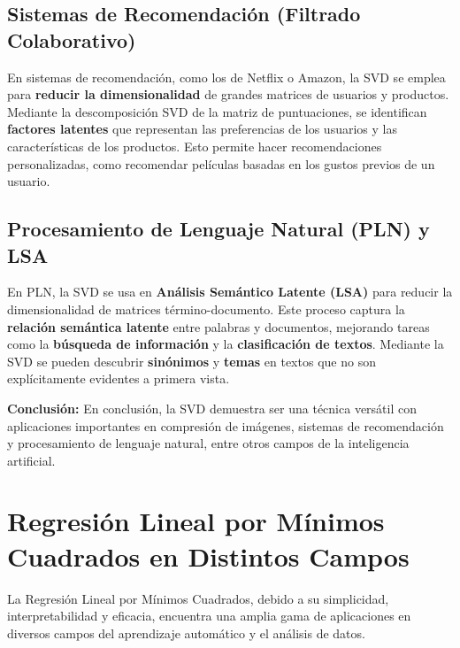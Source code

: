 \documentclass[12pt]{article}
\begin{document}
        \subsection*{Sistemas de Recomendación (Filtrado Colaborativo)}
        \noindent
        En sistemas de recomendación, como los de Netflix o Amazon, la SVD se emplea para \textbf{reducir la dimensionalidad} de grandes matrices de usuarios y productos. Mediante la descomposición SVD de la matriz de puntuaciones, se identifican \textbf{factores latentes} que representan las preferencias de los usuarios y las características de los productos. Esto permite hacer recomendaciones personalizadas, como recomendar películas basadas en los gustos previos de un usuario.
        
        \subsection*{Procesamiento de Lenguaje Natural (PLN) y LSA}
        \noindent
        En PLN, la SVD se usa en \textbf{Análisis Semántico Latente (LSA)} para reducir la dimensionalidad de matrices término-documento. Este proceso captura la \textbf{relación semántica latente} entre palabras y documentos, mejorando tareas como la \textbf{búsqueda de información} y la \textbf{clasificación de textos}. Mediante la SVD se pueden descubrir \textbf{sinónimos} y \textbf{temas} en textos que no son explícitamente evidentes a primera vista.
        
        \noindent
        \textbf{Conclusión:} En conclusión, la SVD demuestra ser una técnica versátil con aplicaciones importantes en compresión de imágenes, sistemas de recomendación y procesamiento de lenguaje natural, entre otros campos de la inteligencia artificial.
        
        \section*{Regresión Lineal por Mínimos Cuadrados en Distintos Campos}
        \noindent
        La Regresión Lineal por Mínimos Cuadrados, debido a su simplicidad, interpretabilidad y eficacia, encuentra una amplia gama de aplicaciones en diversos campos del aprendizaje automático y el análisis de datos.
        
\end{document}
